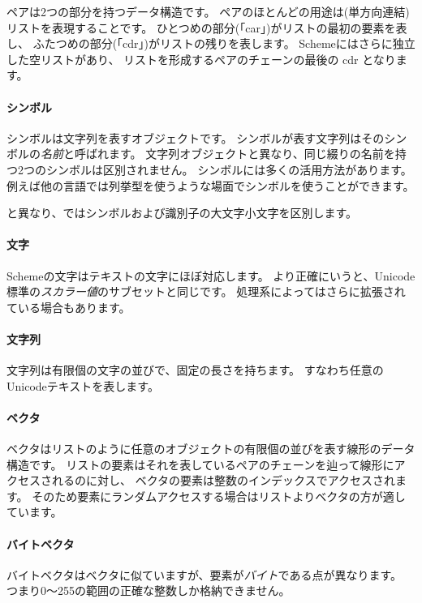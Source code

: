 ペアは2つの部分を持つデータ構造です。
ペアのほとんどの用途は(単方向連結)リストを表現することです。
ひとつめの部分(「car」)がリストの最初の要素を表し、
ふたつめの部分(「cdr」)がリストの残りを表します。
Schemeにはさらに独立した空リストがあり、
リストを形成するペアのチェーンの最後の cdr となります。

\paragraph{シンボル}

シンボルは文字列を表すオブジェクトです。
シンボルが表す文字列はそのシンボルの\textit{名前}と呼ばれます。
文字列オブジェクトと異なり、同じ綴りの名前を持つ2つのシンボルは区別されません。
シンボルには多くの活用方法があります。
例えば他の言語では列挙型を使うような場面でシンボルを使うことができます。

\rfivers{}と異なり、\rsevenrs{}ではシンボルおよび識別子の大文字小文字を区別します。

\paragraph{文字}

Schemeの文字はテキストの文字にほぼ対応します。
より正確にいうと、Unicode標準の\textit{スカラー値}のサブセットと同じです。
処理系によってはさらに拡張されている場合もあります。

\paragraph{文字列}

文字列は有限個の文字の並びで、固定の長さを持ちます。
すなわち任意のUnicodeテキストを表します。

\paragraph{ベクタ}

ベクタはリストのように任意のオブジェクトの有限個の並びを表す線形のデータ構造です。
リストの要素はそれを表しているペアのチェーンを辿って線形にアクセスされるのに対し、
ベクタの要素は整数のインデックスでアクセスされます。
そのため要素にランダムアクセスする場合はリストよりベクタの方が適しています。

\paragraph{バイトベクタ}

バイトベクタはベクタに似ていますが、要素が\textit{バイト}である点が異なります。
つまり0～255の範囲の正確な整数しか格納できません。

